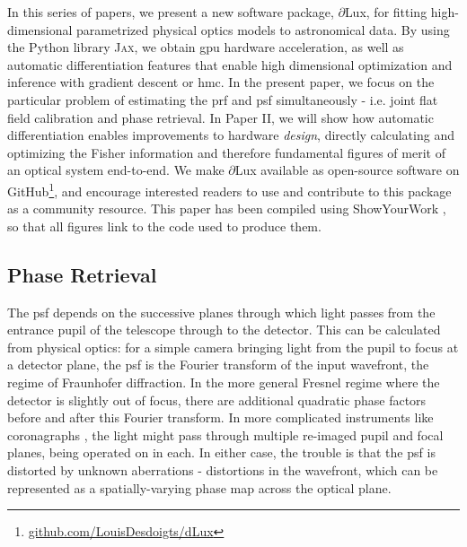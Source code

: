 \documentclass[twocolumn]{spie}
\newcommand\dlux{$\partial$Lux\xspace}
\begin{document}
In this series of papers, we present a new software package, \dlux, for fitting high-dimensional parametrized physical optics models to astronomical data. By using the Python library \textsc{Jax}\cite{jax}, we obtain \ac{gpu} hardware acceleration, as well as automatic differentiation\cite{Margossian2018} features that enable high dimensional optimization and inference with gradient descent or \ac{hmc}. In the present paper, we focus on the particular problem of estimating the \ac{prf} and \ac{psf} simultaneously - i.e. joint flat field calibration and phase retrieval. In Paper II, we will show how automatic differentiation enables improvements to hardware \textit{design}, directly calculating and optimizing the Fisher information and therefore fundamental figures of merit of an optical system end-to-end. We make \dlux available as open-source software on GitHub\footnote{\href{https://github.com/LouisDesdoigts/dLux}{github.com/LouisDesdoigts/dLux}}, and encourage interested readers to use and contribute to this package as a community resource. This paper has been compiled using ShowYourWork \cite{Luger2021}, so that all figures link to the code used to produce them.

\subsection{Phase Retrieval}
The \ac{psf} depends on the successive planes through which light passes from the entrance pupil of the telescope through to the detector. This can be calculated from physical optics: for a simple camera bringing light from the pupil to focus at a detector plane, the \ac{psf} is the Fourier transform of the input wavefront, the regime of Fraunhofer diffraction. In the more general Fresnel regime where the detector is slightly out of focus, there are additional quadratic phase factors before and after this Fourier transform. In more complicated instruments like coronagraphs \cite{Bowler2016}, the light might pass through multiple re-imaged pupil and focal planes, being operated on in each. In either case, the trouble is that the \ac{psf} is distorted by unknown aberrations - distortions in the wavefront, which can be represented as a spatially-varying phase map across the optical plane. 
\end{document}
